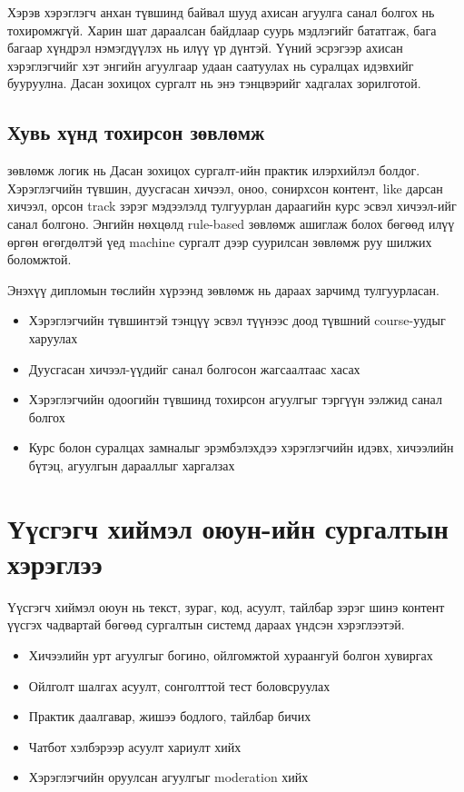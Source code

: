 Хэрэв хэрэглэгч анхан түвшинд байвал шууд ахисан агуулга санал болгох нь тохиромжгүй. Харин шат дараалсан байдлаар суурь мэдлэгийг бататгаж, бага багаар хүндрэл нэмэгдүүлэх нь илүү үр дүнтэй. Үүний эсрэгээр ахисан хэрэглэгчийг хэт энгийн агуулгаар удаан саатуулах нь суралцах идэвхийг бууруулна. Дасан зохицох сургалт нь энэ тэнцвэрийг хадгалах зорилготой.

\subsection{Хувь хүнд тохирсон зөвлөмж}
зөвлөмж логик нь Дасан зохицох сургалт-ийн практик илэрхийлэл болдог. Хэрэглэгчийн түвшин, дуусгасан хичээл, оноо, сонирхсон контент, like дарсан хичээл, орсон track зэрэг мэдээлэлд тулгуурлан дараагийн курс эсвэл хичээл-ийг санал болгоно. Энгийн нөхцөлд rule-based зөвлөмж ашиглаж болох бөгөөд илүү өргөн өгөгдөлтэй үед machine сургалт дээр суурилсан зөвлөмж руу шилжих боломжтой.

Энэхүү дипломын төслийн хүрээнд зөвлөмж нь дараах зарчимд тулгуурласан.
\begin{itemize}
\item Хэрэглэгчийн түвшинтэй тэнцүү эсвэл түүнээс доод түвшний course-уудыг харуулах
\item Дуусгасан хичээл-үүдийг санал болгосон жагсаалтаас хасах
\item Хэрэглэгчийн одоогийн түвшинд тохирсон агуулгыг тэргүүн ээлжид санал болгох
\item Курс болон суралцах замналыг эрэмбэлэхдээ хэрэглэгчийн идэвх, хичээлийн бүтэц, агуулгын дарааллыг харгалзах
\end{itemize}

\section{Үүсгэгч хиймэл оюун-ийн сургалтын хэрэглээ}
Үүсгэгч хиймэл оюун нь текст, зураг, код, асуулт, тайлбар зэрэг шинэ контент үүсгэх чадвартай бөгөөд сургалтын системд дараах үндсэн хэрэглээтэй.
\begin{itemize}
\item Хичээлийн урт агуулгыг богино, ойлгомжтой хураангуй болгон хувиргах
\item Ойлголт шалгах асуулт, сонголттой тест боловсруулах
\item Практик даалгавар, жишээ бодлого, тайлбар бичих
\item Чатбот хэлбэрээр асуулт хариулт хийх
\item Хэрэглэгчийн оруулсан агуулгыг moderation хийх
\end{itemize}

